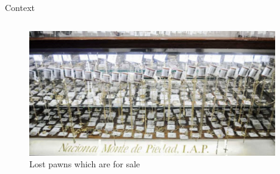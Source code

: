 \documentclass[8pt]{beamer}
\begin{document}
\begin{frame}{Context}
\begin{columns}
\begin{column}{.45\textwidth}
\begin{figure}[H]
\begin{center}
    \end{center}
    \end{figure}
\begin{figure}[H]
    \begin{center}
    \caption{Lost pawns which are for sale}
        \includegraphics[width=0.95\textwidth]{Figuras/empenio3.png}
    \end{center}
    \end{figure}    
    \end{column}    
    \end{columns}
\end{frame}
\end{document}

